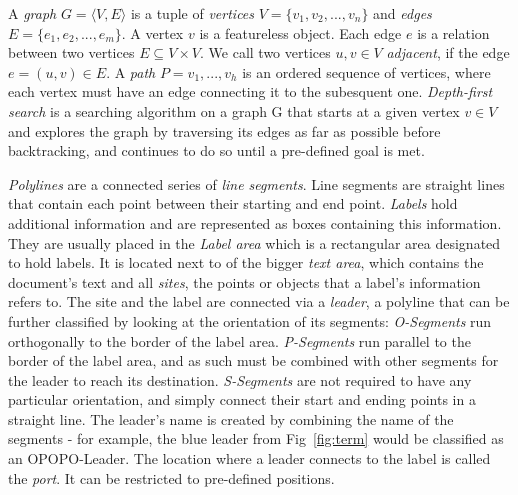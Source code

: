 \documentclass[11pt,a4paper]{vutinfth}
\begin{document}
A \emph{graph} $G=\langle V, E \rangle$ is a tuple of \emph{vertices} $V=\{v_1, v_2, ..., v_n\}$ and \emph{edges} $E=\{e_1, e_2, ..., e_m\}$. A vertex $v$ is a featureless object. %
 Each edge $e$ is a relation between two vertices $E \subseteq V\times V$. %
We call two vertices $u,v \in V$ \emph{adjacent}, if the edge $e=(u,v) \in E$.
 A \emph{path} $P=v_1, ..., v_h$ is an ordered sequence of vertices, where each vertex must have an edge connecting it to the subesquent one.
 \emph{Depth-first search} is a searching algorithm on a graph G that starts at a given vertex $v \in V$ and explores the graph by traversing its edges as far as possible before backtracking, and continues to do so until a pre-defined goal is met. %

\emph{Polylines} are a connected series of \emph{line segments}. Line segments are straight lines that contain each point between their starting and end point. 
\emph{Labels} hold additional information and are represented as boxes containing this information. They are usually placed in the \emph{Label area} which is a rectangular area designated to hold labels. It is located next to of the bigger \emph{text area}, which contains the document's text and all \emph{sites}, the points or objects that a label's information refers to. The site and the label are connected via a \emph{leader}, a polyline that can be further classified by looking at the orientation of its segments: \emph{O-Segments} run orthogonally to the border of the label area. \emph{P-Segments} run parallel to the border of the label area, and as such must be combined with other segments for the leader to reach its destination. \emph{S-Segments} are not required to have any particular orientation, and simply connect their start and ending points in a straight line.
The leader's name is created by combining the name of the segments - for example, the blue leader from Fig~\ref{fig:term} would be classified as an OPOPO-Leader.
The location where a leader connects to the label is called the \emph{port}. It can be restricted to pre-defined positions. %
\end{document}
